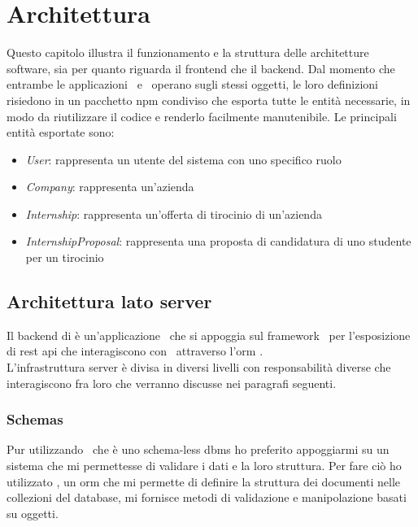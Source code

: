 \chapter{Architettura}

Questo capitolo illustra il funzionamento e la struttura delle architetture software, sia per quanto riguarda il \gls{frontend} che il \gls{backend}. Dal momento che entrambe le applicazioni \angular~e \nodejs~operano sugli stessi oggetti, le loro definizioni risiedono in un pacchetto \gls{npm} condiviso che esporta tutte le entità necessarie, in modo da riutilizzare il codice e renderlo facilmente manutenibile. Le principali entità esportate sono:
\begin{itemize}
	\item \textit{User}: rappresenta un utente del sistema con uno specifico ruolo
	\item \textit{Company}: rappresenta un'azienda
	\item \textit{Internship}: rappresenta un'offerta di tirocinio di un'azienda
	\item \textit{InternshipProposal}: rappresenta una proposta di candidatura di uno studente per un tirocinio
\end{itemize}

\section{Architettura lato server}

Il \gls{backend} di \projectName è un'applicazione \nodejs~che si appoggia sul \gls{framework} \expressjs~per l'esposizione di \acrshort{rest} \acrshort{api} che interagiscono con \mongodb~attraverso l'\acrshort{orm} \mongoosejs. \\

\noindent
L'infrastruttura server è divisa in diversi livelli con responsabilità diverse che interagiscono fra loro che verranno discusse nei paragrafi seguenti.

\subsection{Schemas}
Pur utilizzando \mongodb~che è uno schema-less \acrshort{dbms} ho preferito appoggiarmi su un sistema che mi permettesse di validare i dati e la loro struttura. Per fare ciò ho utilizzato \mongoosejs, un \gls{orm} che mi permette di definire la struttura dei documenti nelle collezioni del database, mi fornisce metodi di validazione e manipolazione basati su oggetti.

